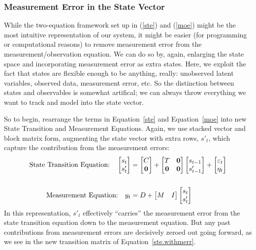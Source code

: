 \documentclass[a4paper,12pt]{article}
\begin{document}
\subsubsection{Measurement Error in the State Vector}

While the two-equation framework set up in (\ref{ste}) and (\ref{moe})
might be the most intuitive representation of our system, it might be
easier (for programming or computational reasons) to remove measurement
error from the measurement/observation equation. We can do so by, again,
enlarging the state space and incorporating measurement error as extra
states. Here, we exploit the fact that states are flexible enough to be
anything, really: unobserved latent variables, observed data,
measurement error, etc. So the distinction between states and
observables is somewhat artifical; we can always throw everything we
want to track and model into the state vector.

So to begin, rearrange the terms in Equation~\ref{ste} and
Equation~\ref{moe} into new State Transition and Measurement Equations.
Again, we use stacked vector and block matrix form, augmenting the state
vector with extra rows, $s'_t$, which capture the contribution from the
measurement errors:
\begin{align}
  \text{State Transition Equation:} \quad
    \begin{bmatrix} s_{t} \\ s'_t \end{bmatrix}
    &= \begin{bmatrix} C \\ \mathbf{0} \end{bmatrix}
    + \begin{bmatrix} T & \mathbf{0} \\ 
    \mathbf{0} & \mathbf{0} \end{bmatrix}
    \begin{bmatrix} s_{t-1} \\ s'_{t-1} \end{bmatrix}
    + \begin{bmatrix} \varepsilon_{t} \\ \eta_t \end{bmatrix}
    \label{ste.withmerr}
  \\ \notag \\
  \text{Measurement Equation:} \quad
    y_{t} &= D + 
    \begin{bmatrix} M & I \end{bmatrix}
    \begin{bmatrix} s_{t} \\ s'_t \end{bmatrix}
\end{align}
In this representation, $s'_t$ effectively ``carries'' the measurement
error from the state transition equation down to the measurement
equation. But any past contributions from measurement errors are
decisively zeroed out going forward, as we see in the new transition
matrix of Equation~\ref{ste.withmerr}.
\end{document}
